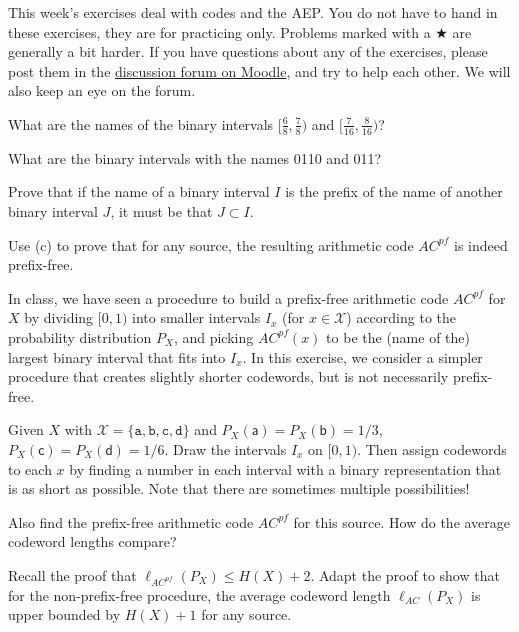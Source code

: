 \documentclass[a4paper,10pt,landscape,twocolumn]{scrartcl}
\begin{document}
\practiceproblems

{\sffamily\noindent
This week's exercises deal with codes and the AEP. You do not have to hand in these exercises, they are for practicing only. Problems marked with a $\bigstar$ are generally a bit harder. If you have questions about any of the exercises, please post them in the \href{https://www.moodle.ch/lms/mod/forum/view.php?id=1761}{discussion forum on Moodle}, and try to help each other. We will also keep an eye on the forum.
}

\begin{exercise}
	\begin{subex}
	What are the names of the binary intervals $[\frac{6}{8},\frac{7}{8})$ and $[\frac{7}{16},\frac{8}{16})$?
	\end{subex}
	\begin{subex}
	What are the binary intervals with the names 0110 and 011?
	\end{subex}
	\begin{subex}
	Prove that if the name of a binary interval $I$ is the prefix of the name of another binary interval $J$, it must be that $J \subset I$.
	\end{subex}
	\begin{subex}
	Use (c) to prove that for any source, the resulting arithmetic code $AC^{pf}$ is indeed prefix-free.
	\end{subex}
\end{exercise}

\begin{exercise}
In class, we have seen a procedure to build a prefix-free arithmetic code $AC^{pf}$ for $X$ by dividing $[0,1)$ into smaller intervals $I_x$ (for $x \in \mathcal{X}$) according to the probability distribution $P_X$, and picking $AC^{pf}(x)$ to be the (name of the) largest binary interval that fits into $I_x$. In this exercise, we consider a simpler procedure that creates slightly shorter codewords, but is not necessarily prefix-free.
	\begin{subex}
	Given $X$ with $\mathcal{X} = \{\mathtt{a,b,c,d}\}$ and $P_X(\mathsf{a}) = P_X(\mathsf{b}) = 1/3$, $P_X(\mathsf{c}) = P_X(\mathsf{d}) = 1/6$. Draw the intervals $I_x$ on $[0,1)$. Then assign codewords to each $x$ by finding a number in each interval with a binary representation that is as short as possible. Note that there are sometimes multiple possibilities!
	\end{subex}
	\begin{subex}
	Also find the prefix-free arithmetic code $AC^{pf}$ for this source. How do the average codeword lengths compare?
	\end{subex}
	\begin{subex}
	Recall the proof that $\ell_{AC^{pf}}(P_X) \leq H(X) + 2$. Adapt the proof to show that for the non-prefix-free procedure, the average codeword length $\ell_{AC}(P_X)$ is upper bounded by $H(X) + 1$ for any source.
	\end{subex}
\end{exercise}
\end{document}
